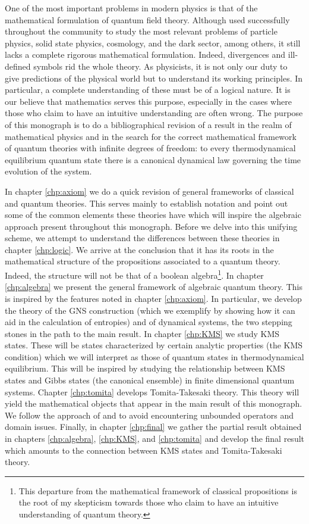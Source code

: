 One of the most important problems in modern physics is that of the mathematical formulation of quantum field theory. Although used successfully throughout the community to study the most relevant problems of particle physics, solid state physics, cosmology, and the dark sector, among others, it still lacks a complete rigorous mathematical formulation. Indeed, divergences and ill-defined symbols rid the whole theory. As physicists, it is not only our duty to give predictions of the physical world but to understand its working principles. In particular, a complete understanding of these must be of a logical nature. It is our believe that mathematics serves this purpose, especially in the cases where those who claim to have an intuitive understanding are often wrong. The purpose of this monograph is to do a bibliographical revision of a result in the realm of mathematical physics and in the search for the correct mathematical framework of quantum theories with infinite degrees of freedom: to every thermodynamical equilibrium quantum state there is a canonical dynamical law governing the time evolution of the system.

In chapter \ref{chp:axiom} we do a quick revision of general frameworks of classical and quantum theories. This serves mainly to establish notation and point out some of the common elements these theories have which will inspire the algebraic approach present throughout this monograph. Before we delve into this unifying scheme, we attempt to understand the differences between these theories in chapter \ref{chp:logic}. We arrive at the conclusion that it has its roots in the mathematical structure of the propositions associated to a quantum theory. Indeed, the structure will not be that of a boolean algebra\footnote{This departure from the mathematical framework of classical propositions is the root of my skepticism towards those who claim to have an intuitive understanding of quantum theory.}. In chapter \ref{chp:algebra} we present the general framework of algebraic quantum theory. This is inspired by the features noted in chapter \ref{chp:axiom}. In particular, we develop the theory of the GNS construction (which we exemplify by showing how it can aid in the calculation of entropies) and of dynamical systems, the two stepping stones in the path to the main result. In chapter \ref{chp:KMS} we study KMS states. These will be states characterized by certain analytic properties (the KMS condition) which we will interpret as those of quantum states in thermodynamical equilibrium. This will be inspired by studying the relationship between KMS states and Gibbs states (the canonical ensemble) in finite dimensional quantum systems. Chapter \ref{chp:tomita} develops Tomita-Takesaki theory. This theory will yield the mathematical objects that appear in the main result of this monograph. We follow the approach of \cite{Duvenhage1999} and \cite{Rieffel1977} to avoid encountering unbounded operators and domain issues. Finally, in chapter \ref{chp:final} we gather the partial result obtained in chapters \ref{chp:algebra}, \ref{chp:KMS}, and \ref{chp:tomita} and develop the final result which amounts to the connection between KMS states and Tomita-Takesaki theory.  

   